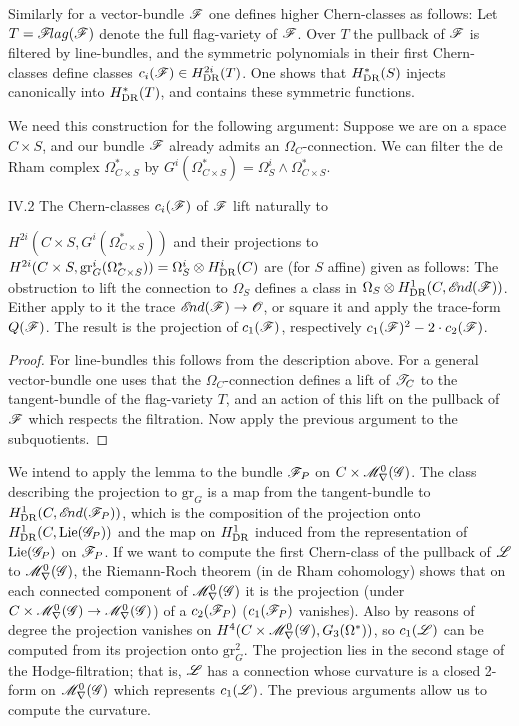 \documentclass[12pt,english]{smfart}
\theoremstyle{plain} \newtheorem{innerthm}{Theorem} \newtheorem{innerlem}{Lemma} \newtheorem{innerprop}{Proposition} \newtheorem{innercor}{Corollary} \theoremstyle{definition} \newtheorem{innerdefn}{Definition} \newtheorem{innerconstr}{Construction} \theoremstyle{remark} \newtheorem*{remark}{Remark} \newtheorem*{remarks}{Remarks} \newtheorem*{applications}{Applications}
\begin{document}
Similarly for a vector-bundle $\mathscr{F}$ one defines higher Chern-classes as follows: Let $T=\mathscr{F}\!lag(\mathscr{F})$ denote the full flag-variety of $\mathscr{F}$. Over $T$ the pullback of $\mathscr{F}$ is filtered by line-bundles, and the symmetric polynomials in their first Chern-classes define classes $c_i(\mathscr{F})\in H_{\mathrm{DR}}^{2i}(T)$. One shows that $H_{\mathrm{DR}}^*(S)$ injects canonically into $H_{\mathrm{DR}}^*(T)$, and contains these symmetric functions.

We need this construction for the following argument: Suppose we are on a space $C\times S$, and our bundle $\mathscr{F}$ already admits an $\Omega_C$-connection. We can filter the de Rham complex $\Omega^*_{C\times S}$ by $G^i(\Omega^*_{C\times S})=\Omega^i_S\wedge\Omega^*_{C\times S}$.

\begin{lemma}{IV.2}\label{lem:IV.2}
The Chern-classes $c_i(\mathscr{F})$ of $\mathscr{F}$ lift naturally to


$H^{2i}(C\times S,G^i(\Omega^*_{C\times S}))$ and their projections to $H^{2i}(C\times S,\mathrm{gr}^i_G(\Omega^*_{C\times S})) =\Omega^i_S\otimes H_{\mathrm{DR}}^i(C)$ are (for $S$ affine) given as follows: The obstruction to lift the connection to $\Omega_S$ defines a class in $\Omega_S\otimes H_{\mathrm{DR}}^1(C,\mathscr{E}\!nd(\mathscr{F}))$. Either apply to it the trace $\mathscr{E}\!nd(\mathscr{F})\to\mathscr{O}$, or square it and apply the trace-form $Q(\mathscr{F})$. The result is the projection of $c_1(\mathscr{F})$, respectively $c_1(\mathscr{F})^2-2\cdot c_2(\mathscr{F})$.
\end{lemma}

\begin{proof}
For line-bundles this follows from the description above. For a general vector-bundle one uses that the $\Omega_C$-connection defines a lift of $\mathscr{T}_C$ to the tangent-bundle of the flag-variety $T$, and an action of this lift on the pullback of $\mathscr{F}$ which respects the filtration. Now apply the previous argument to the subquotients.
\end{proof}

We intend to apply the lemma to the bundle $\mathscr{F}_P$ on $C\times\mathscr{M}^0_\nabla(\mathscr{G})$. The class describing the projection to $\mathrm{gr}_G$ is a map from the tangent-bundle to $H_{\mathrm{DR}}^1(C,\mathscr{E}\!nd(\mathscr{F}_P))$, which is the composition of the projection onto $H_{\mathrm{DR}}^1(C,\operatorname{Lie}(\mathscr{G}_P))$ and the map on $H_{\mathrm{DR}}^1$ induced from the representation of $\operatorname{Lie}(\mathscr{G}_P)$ on $\mathscr{F}_P$. If we want to compute the first Chern-class of the pullback of $\mathscr{L}$ to $\mathscr{M}^0_\nabla(\mathscr{G})$, the Riemann-Roch theorem (in de Rham cohomology) shows that on each connected component of $\mathscr{M}^0_\nabla(\mathscr{G})$ it is the projection (under $C\times\mathscr{M}^0_\nabla(\mathscr{G})\to\mathscr{M}^0_\nabla(\mathscr{G})$) of a $c_2(\mathscr{F}_P)$ ($c_1(\mathscr{F}_P)$ vanishes). Also by reasons of degree the projection vanishes on $H^4(C\times\mathscr{M}^0_\nabla(\mathscr{G}),G_3(\Omega^*))$, so $c_1(\mathscr{L})$ can be computed from its projection onto $\mathrm{gr}^2_G$. The projection lies in the second stage of the Hodge-filtration; that is, $\mathscr{L}$ has a connection whose curvature is a closed 2-form on $\mathscr{M}^0_\nabla(\mathscr{G})$ which represents $c_1(\mathscr{L})$. The previous arguments allow us to compute the curvature.
\end{document}
